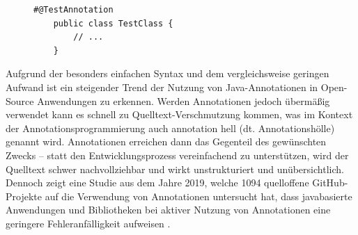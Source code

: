 \begin{figure}[H]
	\centering
	\begin{lstlisting}[caption={Beispiel einer annotierten Klasse}, captionpos=b, label=lst:annotated_example]
	#@TestAnnotation
	public class TestClass {
	    // ...
	}
	\end{lstlisting}
\end{figure}
\noindent Aufgrund der besonders einfachen Syntax und dem vergleichsweise geringen Aufwand ist ein steigender Trend der Nutzung von Java-Annotationen in Open-Source Anwendungen zu erkennen. Werden Annotationen jedoch übermäßig verwendet kann es schnell zu Quelltext-Verschmutzung kommen, was im Kontext der Annotationsprogrammierung auch \glqq annotation hell\grqq{} (dt. Annotationshölle) genannt wird. Annotationen erreichen dann das Gegenteil des gewünschten Zwecks -- statt den Entwicklungsprozess vereinfachend zu unterstützen, wird der Quelltext schwer nachvollziehbar und wirkt unstrukturiert und unübersichtlich.\\
Dennoch zeigt eine Studie aus dem Jahre 2019, welche 1094 quelloffene GitHub-Projekte auf die Verwendung von Annotationen untersucht hat, dass javabasierte Anwendungen und Bibliotheken bei aktiver Nutzung von Annotationen eine geringere Fehleranfälligkeit aufweisen \cite{Yu2019}.
